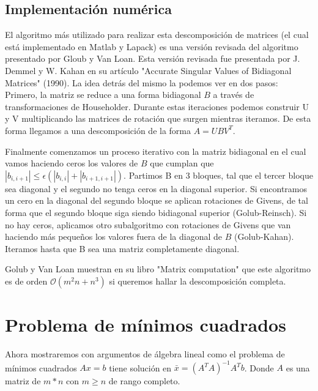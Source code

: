 \documentclass[12pt]{article}
\begin{document}
\subsection{Implementación numérica}

El algoritmo más utilizado para realizar esta descomposición de matrices (el cual está implementado en Matlab y Lapack) es una versión revisada del algoritmo presentado por Gloub y Van Loan. Esta versión revisada fue presentada por J. Demmel y W. Kahan en su artículo "Accurate Singular Values of Bidiagonal Matrices" (1990). La idea detrás del mismo la podemos ver en dos pasos: Primero, la matriz se reduce a una forma bidiagonal $B$ a través de transformaciones de Householder. Durante estas iteraciones podemos construir U y V multiplicando las matrices de rotación que surgen mientras iteramos. De esta forma llegamos a una descomposición de la forma $A=UBV^T$.

Finalmente comenzamos un proceso iterativo con la matriz bidiagonal en el cual vamos haciendo ceros los valores de $B$ que cumplan que $|b_{i,i+1}|\leq \epsilon(|b_{i,i}|+|b_{i+1,i+1}|).$ Partimos B en 3 bloques, tal que el tercer bloque sea diagonal y el segundo no tenga ceros en la diagonal superior. Si encontramos un cero en la diagonal del segundo bloque se aplican rotaciones de Givens, de tal forma que el segundo bloque siga siendo bidiagonal superior (Golub-Reinsch). Si no hay ceros, aplicamos otro subalgoritmo con rotaciones de Givens que van haciendo más pequeños los valores fuera de la diagonal de $B$ (Golub-Kahan). Iteramos hasta que B sea una matriz completamente diagonal.

Golub y Van Loan muestran en su libro "Matrix computation" que este algoritmo es de orden $\mathcal{O}(m^2n + n^3)$ si queremos hallar la descomposición completa.



\section{Problema de mínimos cuadrados}

Ahora mostraremos con argumentos de álgebra lineal como el problema de mínimos cuadrados $Ax=b$ tiene solución en $\bar x = (A^TA)^{-1}A^Tb$. Donde $A$ es una matriz de $m * n$ con $m \geq n$ de rango completo.
\end{document}
